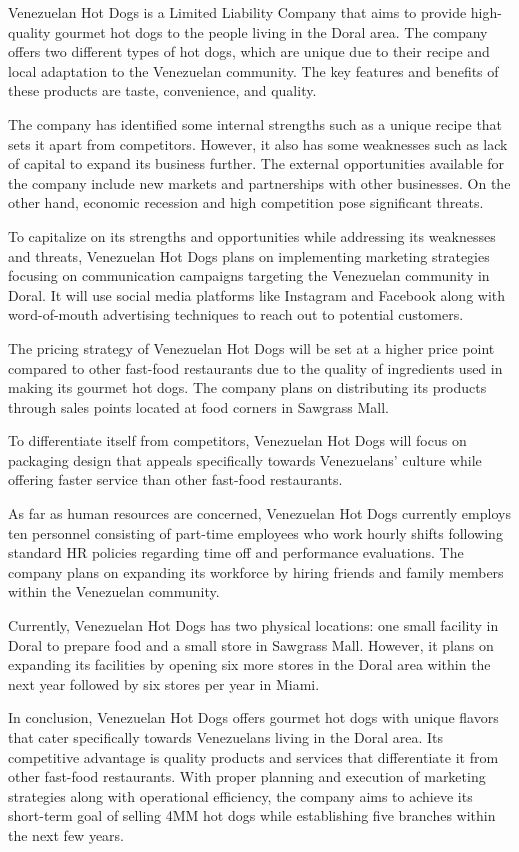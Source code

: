 Venezuelan Hot Dogs is a Limited Liability Company that aims to provide high-quality gourmet hot dogs to the people living in the Doral area. The company offers two different types of hot dogs, which are unique due to their recipe and local adaptation to the Venezuelan community. The key features and benefits of these products are taste, convenience, and quality.

The company has identified some internal strengths such as a unique recipe that sets it apart from competitors. However, it also has some weaknesses such as lack of capital to expand its business further. The external opportunities available for the company include new markets and partnerships with other businesses. On the other hand, economic recession and high competition pose significant threats.

To capitalize on its strengths and opportunities while addressing its weaknesses and threats, Venezuelan Hot Dogs plans on implementing marketing strategies focusing on communication campaigns targeting the Venezuelan community in Doral. It will use social media platforms like Instagram and Facebook along with word-of-mouth advertising techniques to reach out to potential customers.

The pricing strategy of Venezuelan Hot Dogs will be set at a higher price point compared to other fast-food restaurants due to the quality of ingredients used in making its gourmet hot dogs. The company plans on distributing its products through sales points located at food corners in Sawgrass Mall.

To differentiate itself from competitors, Venezuelan Hot Dogs will focus on packaging design that appeals specifically towards Venezuelans' culture while offering faster service than other fast-food restaurants.

As far as human resources are concerned, Venezuelan Hot Dogs currently employs ten personnel consisting of part-time employees who work hourly shifts following standard HR policies regarding time off and performance evaluations. The company plans on expanding its workforce by hiring friends and family members within the Venezuelan community.

Currently, Venezuelan Hot Dogs has two physical locations: one small facility in Doral to prepare food and a small store in Sawgrass Mall. However, it plans on expanding its facilities by opening six more stores in the Doral area within the next year followed by six stores per year in Miami.

In conclusion, Venezuelan Hot Dogs offers gourmet hot dogs with unique flavors that cater specifically towards Venezuelans living in the Doral area. Its competitive advantage is quality products and services that differentiate it from other fast-food restaurants. With proper planning and execution of marketing strategies along with operational efficiency, the company aims to achieve its short-term goal of selling 4MM hot dogs while establishing five branches within the next few years.